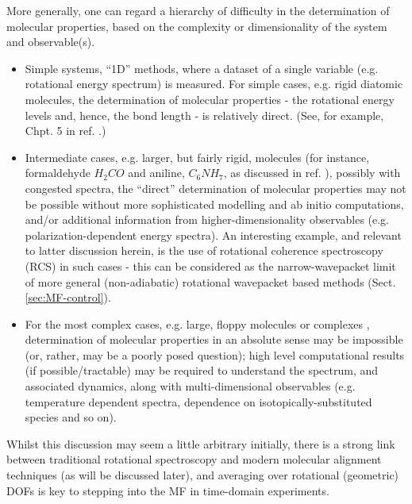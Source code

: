 \documentclass[10pt]{article}
\begin{document}

More generally, one can regard a hierarchy of difficulty in the determination of molecular properties, based on the complexity or dimensionality of the system and observable(s).
\begin{itemize}
\item Simple systems, ``1D” methods, where a dataset of a single variable (e.g. rotational energy spectrum) is measured. For simple cases, e.g. rigid diatomic molecules, the determination of molecular properties - the rotational energy levels and, hence, the bond length - is relatively direct. (See, for example, Chpt. 5 in ref. \cite{hollasHighRes}.) %
\item Intermediate cases, e.g. larger, but fairly rigid, molecules (for instance, formaldehyde $H_2CO$ and aniline, $C_6NH_7$, as discussed in ref. \cite{hollasHighRes}), possibly with congested spectra, the ``direct” determination of molecular properties may not be possible without more sophisticated modelling and ab initio computations, and/or additional information from higher-dimensionality observables (e.g. polarization-dependent energy spectra). An interesting example, and relevant to latter discussion herein, is the use of rotational coherence spectroscopy (RCS) in such cases \cite{Felker1987} - this can be considered as the narrow-wavepacket limit of more general (non-adiabatic) rotational wavepacket based methods (Sect. \ref{sec:MF-control}).
\item For the most complex cases, e.g. large, floppy molecules or complexes \cite{bunkerMolSymm,schmiedt2015SymmetryExtremelyFloppy}, determination of molecular properties in an absolute sense may be impossible (or, rather, may be a poorly posed question); high level computational results (if possible/tractable) may be required to understand the spectrum, and associated dynamics, along with multi-dimensional observables (e.g. temperature dependent spectra, dependence on isotopically-substituted species and so on).
\end{itemize}    

Whilst this discussion may seem a little arbitrary initially, there is a strong link between traditional rotational spectroscopy and modern molecular alignment techniques (as will be discussed later), and averaging over rotational (geometric) DOFs is key to stepping into the MF in time-domain experiments.
\end{document}
